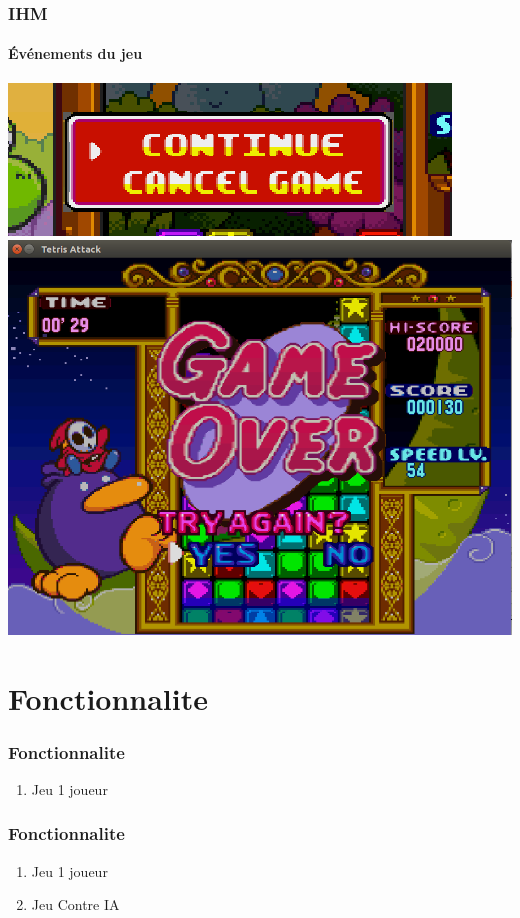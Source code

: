\documentclass{beamer}
\begin{document}
\begin{darkframes}
    \begin{frame}
 	 \frametitle{IHM}
 	 \begin{center}
 	 \framesubtitle{Événements du jeu}
		\includegraphics[scale=0.40]{./Image/pause.png}\\%
		\includegraphics[scale=0.20]{./Image/gameOver.png}
		\end{center}
    \end{frame}
    
    \section{Fonctionnalite}
 \begin{frame}
 	 \frametitle{Fonctionnalite}
 	   \begin{enumerate}
    \item Jeu 1 joueur 
  \end{enumerate}
    \end{frame}
    
 \begin{frame}
 	 \frametitle{Fonctionnalite}
 	   \begin{enumerate}
    \item Jeu 1 joueur 
    \item Jeu Contre IA
  \end{enumerate}
    \end{frame}
    

\end{darkframes}
\end{document}
